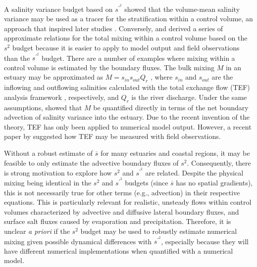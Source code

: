 A salinity variance budget based on $s^{\prime^2}$ \citep{Li_2018} showed that the volume-mean salinity variance may be used as a tracer for the stratification within a control volume, an approach that inspired later studies \citep{Broatch_2022, Li_2021, Wang_2018}. Conversely, \citet{Lorenz_2021} and \citet{Burchard_2019} derived a series of approximate relations for the total mixing within a control volume based on the $s^2$ budget because it is easier to apply to model output and field observations than the $s^{\prime^2}$ budget. There are a number of examples where mixing within a control volume is estimated by the boundary fluxes. The bulk mixing $M$ in an estuary may be approximated as $M=s_{in}s_{out}Q_r$ \citep{Burchard_2019, Burchard_2020}, where $s_{in}$ and $s_{out}$ are the inflowing and outflowing salinities calculated with the total exchange flow (TEF) analysis framework \citep{MacCready_2011}, respectively, and $Q_r$ is the river discharge. Under the same assumptions, \citet{Qu_2022_box} showed that $M$ be quantified directly in terms of the net boundary advection of salinity variance into the estuary. Due to the recent invention of the theory, TEF has only been applied to numerical model output. However, a recent paper by \citet{Lemagie_2022} suggested how TEF may be measured with field observations. 

Without a robust estimate of $\overline{s}$ for many estuaries and coastal regions, it may be feasible to only estimate the advective boundary fluxes of $s^2$. Consequently, there is strong motivation to explore how $s^2$ and $s^{\prime^2}$ are related. Despite the physical mixing being identical in the $s^2$ and $s^{\prime^2}$ budgets (since $\overline{s}$ has no spatial gradients), this is not necessarily true for other terms (e.g., advection) in their respective equations. This is particularly relevant for realistic, unsteady flows within control volumes characterized by advective and diffusive lateral boundary fluxes, and surface salt fluxes caused by evaporation and precipitation. Therefore, it is unclear \textit{a priori} if the $s^2$ budget may be used to robustly estimate numerical mixing given possible dynamical differences with $s^{\prime^2}$, especially because they will have different numerical implementations when quantified with a numerical model.

